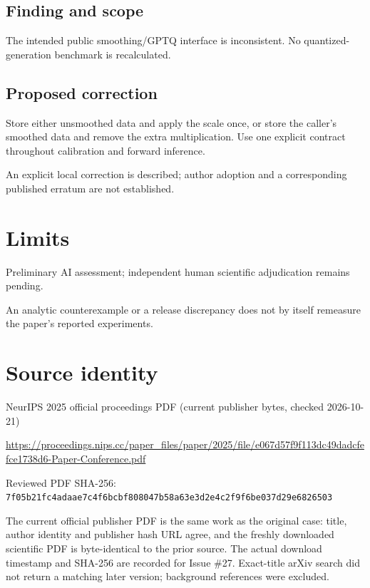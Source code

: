 \documentclass[11pt]{article}
\begin{document}
\subsection*{Finding and scope}

The intended public smoothing/GPTQ interface is inconsistent. No quantized-generation benchmark is recalculated.

\subsection*{Proposed correction}

Store either unsmoothed data and apply the scale once, or store the caller’s smoothed data and remove the extra multiplication. Use one explicit contract throughout calibration and forward inference.

An explicit local correction is described; author adoption and a corresponding published erratum are not established.

\section*{Limits}

Preliminary AI assessment; independent human scientific adjudication remains pending.\par

An analytic counterexample or a release discrepancy does not by itself remeasure the paper’s reported experiments.\par

\section*{Source identity}

NeurIPS 2025 official proceedings PDF (current publisher bytes, checked 2026-10-21)

\url{https://proceedings.nips.cc/paper_files/paper/2025/file/e067d57f9f113dc49dadcfefce1738d6-Paper-Conference.pdf}

Reviewed PDF SHA-256: \nolinkurl{7f05b21fc4adaae7c4f6bcbf808047b58a63e3d2e4c2f9f6be037d29e6826503}

The current official publisher PDF is the same work as the original case: title, author identity and publisher hash URL agree, and the freshly downloaded scientific PDF is byte-identical to the prior source. The actual download timestamp and SHA-256 are recorded for Issue \#27. Exact-title arXiv search did not return a matching later version; background references were excluded.
\end{document}
